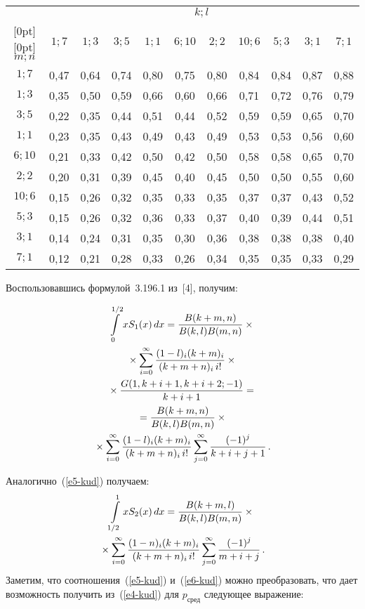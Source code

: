\begin{multicols}{2}
\begin{table*}
\begin{center}
 \begin{tabular}{|c|c|c|c|c|c|c|c|c|c|c|}
 \hline
 &\multicolumn{10}{c|}{$k; l$}\\
 \cline{2-11}
 \multicolumn{1}{|c|}{\raisebox{6pt}[0pt][0pt]{${m;n}$}}  & ${1; 7}$ & ${1; 3}$ & ${3; 5}$ & ${1; 1}$ & ${6; 10}$ & ${2; 2}$ & ${10; 6}$ & ${5; 3}$ & ${3; 1}$ & ${7; 1}$\\
 \hline
${1; 7}$&0,47&0,64&0,74&0,80&0,75&0,80&0,84&0,84&0,87&0,88\\
${1; 3}$&0,35&0,50&0,59&0,66&0,60&0,66&0,71&0,72&0,76&0,79\\
${3; 5}$&0,22&0,35&0,44&0,51&0,44&0,52&0,59&0,59&0,65&0,70\\
${1; 1}$&0,23&0,35&0,43&0,49&0,43&0,49&0,53&0,53&0,56&0,60\\
\hphantom{9}${6; 10}$&0,21&0,33&0,42&0,50&0,42&0,50&0,58&0,58&0,65&0,70\\
${2; 2}$&0,20&0,31&0,39&0,45&0,40&0,45&0,50&0,50&0,55&0,60\\
${10; 6}$\hphantom{9}&0,15&0,26&0,32&0,35&0,33&0,35&0,37&0,37&0,43&0,52\\
${5; 3}$&0,15&0,26&0,32&0,36&0,33&0,37&0,40&0,39&0,44&0,51\\
${3; 1}$&0,14&0,24&0,31&0,35&0,30&0,36&0,38&0,38&0,38&0,40\\
${7; 1}$&0,12&0,21&0,28&0,33&0,26&0,34&0,35&0,35&0,33&0,29\\
 \hline
 \end{tabular}
 \end{center}
 \vspace*{-16pt}
 \end{table*}

\noindent
Воспользовавшись формулой~3.196.1 из~[4], получим:

\noindent
\begin{multline}
\int\limits_{0}^{1/2}xS_1(x)\,dx=
\displaystyle\frac{\displaystyle B(k+m,n)\mathstrut}{\displaystyle B(k,l)B(m,n)\mathstrut} \times{}\\
{}\times \sum\limits_{i=0}^\infty
\displaystyle\frac{\displaystyle (1-l)_i(k+m)_i\mathstrut}{\displaystyle (k+m+n)_i\,i!\mathstrut}\times{}\\
{}\times \displaystyle\frac{\displaystyle G(1,k+i+1,k+i+2;-1)\mathstrut}{\displaystyle k+i+1\mathstrut}={}\\
{}=\displaystyle\frac{\displaystyle B(k+m,n)\mathstrut}{\displaystyle B(k,l)B(m,n)\mathstrut}\times{}\\
{}\times \sum\limits_{i=0}^\infty
\displaystyle\frac{\displaystyle (1-l)_i(k+m)_i\mathstrut}{\displaystyle (k+m+n)_i\,i!\mathstrut}\sum\limits_{j=0}^\infty
\displaystyle\frac{\displaystyle (-1)^j\mathstrut}{\displaystyle k+i+j+1\mathstrut}\,.
\label{e5-kud}
\end{multline}

\noindent
Аналогично~(\ref{e5-kud}) получаем:
\begin{multline}
\int\limits_{1/2}^{1}xS_2(x)\,dx=
\displaystyle\frac{\displaystyle B(k+m,l)\mathstrut}{\displaystyle B(k,l)B(m,n)\mathstrut}\times{}\\
{}\times\sum\limits_{i=0}^\infty
\displaystyle\frac{\displaystyle (1-n)_i(k+m)_i\mathstrut}{\displaystyle (k+m+n)_i\,i!\mathstrut}\sum\limits_{j=0}^\infty
\displaystyle\frac{\displaystyle (-1)^j\mathstrut}{\displaystyle m+i+j\mathstrut}\,.\label{e6-kud}
\end{multline}
Заметим, что соотношения~(\ref{e5-kud}) и~(\ref{e6-kud})
можно преобразовать, что дает возможность получить из~(\ref{e4-kud})
для $p_{\mathrm{сред}}$ следующее выражение:


\end{multicols}
